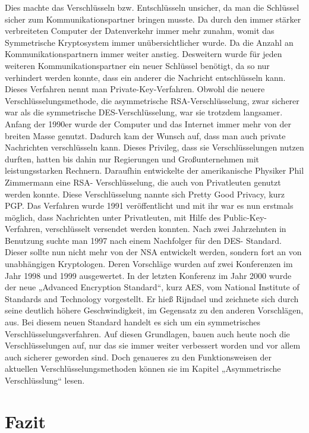 Dies machte das Verschlüsseln bzw. Entschlüsseln unsicher, da man die Schlüssel sicher zum Kommunikationspartner bringen musste. Da durch den immer stärker verbreiteten Computer der Datenverkehr immer mehr zunahm, womit das Symmetrische Kryptosystem immer unübersichtlicher wurde. Da die Anzahl an Kommunikationspartnern immer weiter anstieg. Desweitern wurde für jeden weiteren Kommunikationspartner ein neuer Schlüssel benötigt, da so nur verhindert werden konnte, dass ein anderer die Nachricht entschlüsseln kann. Dieses Verfahren nennt man Private-Key-Verfahren. Obwohl die neuere Verschlüsselungsmethode, die asymmetrische RSA-Verschlüsselung, zwar sicherer war als die symmetrische DES-Verschlüsselung, war sie trotzdem langsamer. Anfang der 1990er wurde der Computer und das Internet immer mehr von der breiten Masse genutzt. Dadurch kam der Wunsch auf, dass man auch private Nachrichten verschlüsseln kann. Dieses Privileg, dass sie Verschlüsselungen nutzen durften, hatten bis dahin nur Regierungen und Großunternehmen mit leistungsstarken Rechnern. Daraufhin entwickelte der amerikanische Physiker Phil Zimmermann eine RSA- Verschlüsselung, die auch von Privatleuten genutzt werden konnte. Diese Verschlüsselung nannte sich Pretty Good Privacy, kurz PGP. Das Verfahren wurde 1991 veröffentlicht und mit ihr war es nun erstmals möglich, dass Nachrichten unter Privatleuten, mit Hilfe des Public-Key-Verfahren, verschlüsselt versendet werden konnten. Nach zwei Jahrzehnten in Benutzung suchte man 1997 nach einem Nachfolger für den DES- Standard. Dieser sollte nun nicht mehr von der NSA entwickelt werden, sondern fort an von unabhängigen Kryptologen. Deren Vorschläge wurden auf zwei Konferenzen im Jahr 1998 und 1999 ausgewertet. In der letzten Konferenz im Jahr 2000 wurde der neue „Advanced Encryption Standard“, kurz AES, vom National Institute of Standards and Technology vorgestellt. Er hieß Rijndael und zeichnete sich durch seine deutlich höhere Geschwindigkeit, im Gegensatz zu den anderen Vorschlägen, aus. Bei diesem neuen Standard handelt es sich um ein symmetrisches Verschlüsselungsverfahren. Auf diesen Grundlagen, bauen auch heute noch die Verschlüsselungen auf, nur das sie immer weiter verbessert worden und vor allem auch sicherer geworden sind. Doch genaueres zu den Funktionsweisen der aktuellen Verschlüsselungsmethoden können sie im Kapitel „Asymmetrische Verschlüsslung“ lesen. 


\section{Fazit}

